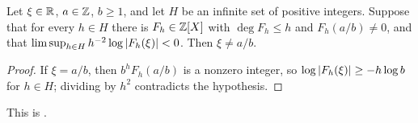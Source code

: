 \begin{proposition}[criterion]\label{prop:criterion}
Let $\xi\in\mathbb{R}$, $a\in\mathbb{Z}$, $b\ge1$, and let $H$ be an infinite set of positive integers. Suppose
that for every $h\in H$ there is $F_h\in\mathbb{Z}[X]$ with $\deg F_h\le h$ and $F_h(a/b)\ne0$, and that
$\limsup_{h\in H}h^{-2}\log\left\lvert F_h(\xi)\right\rvert<0$. Then $\xi\ne a/b$.
\end{proposition}

\begin{proof}
If $\xi=a/b$, then $b^hF_h(a/b)$ is a nonzero integer, so $\log\left\lvert F_h(\xi)\right\rvert\ge-h\log b$ for
$h\in H$; dividing by $h^2$ contradicts the hypothesis.
\end{proof}

This is \cite[Proposition~2.4]{Krisman2026units}.
